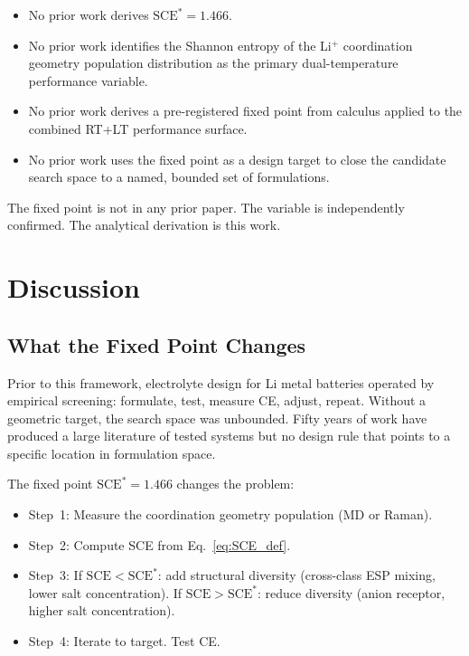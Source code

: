 \documentclass[11pt]{article}
\theoremstyle{plain}
\theoremstyle{definition}
\theoremstyle{remark}
\begin{document}
\begin{itemize}[leftmargin=2em]
  \item No prior work derives $\mathrm{SCE}^{*} = 1.466$.
  \item No prior work identifies the Shannon entropy of the Li$^+$ coordination
        geometry population distribution as the primary dual-temperature
        performance variable.
  \item No prior work derives a pre-registered fixed point from calculus applied
        to the combined RT+LT performance surface.
  \item No prior work uses the fixed point as a design target to close the
        candidate search space to a named, bounded set of formulations.
\end{itemize}

The fixed point is not in any prior paper.  The variable is independently
confirmed.  The analytical derivation is this work.

\section{Discussion}

\subsection{What the Fixed Point Changes}

Prior to this framework, electrolyte design for Li metal batteries operated
by empirical screening: formulate, test, measure CE, adjust, repeat.  Without
a geometric target, the search space was unbounded.  Fifty years of work have
produced a large literature of tested systems but no design rule that points
to a specific location in formulation space.

The fixed point $\mathrm{SCE}^{*} = 1.466$ changes the problem:
\begin{itemize}[leftmargin=2em]
  \item Step~1: Measure the coordination geometry population (MD or Raman).
  \item Step~2: Compute SCE from Eq.~\eqref{eq:SCE_def}.
  \item Step~3: If $\mathrm{SCE} < \mathrm{SCE}^{*}$: add structural diversity
        (cross-class ESP mixing, lower salt concentration).
        If $\mathrm{SCE} > \mathrm{SCE}^{*}$: reduce diversity (anion receptor,
        higher salt concentration).
  \item Step~4: Iterate to target.  Test CE.
\end{itemize}
\end{document}
